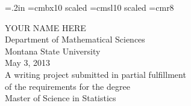 \pagestyle{myheadings}
\jot=.2in
\setlength{\topmargin}{-.5 in}
\setlength{\footheight}{0 in}
\setlength{\textheight}{9. in}
\setlength{\oddsidemargin}{.1in}
\setlength{\evensidemargin}{-.35in}
\setlength{\textwidth}{6in}
\font\heada=cmbx10 scaled
\font\headb=cmsl10 scaled
\font\headc=cmr8
\raggedright
\setlength{\parindent}{2 em}

\begin{titlepage}
\null
\vspace{2.in}
\begin{center}
{\LARGE\bf } \vspace{.1in}

{\LARGE\bf } \vspace{.1in} 

{\LARGE\bf } \vspace{.1in}  

{\LARGE\bf } \vspace{.1in}  

{\LARGE\bf } \vspace{.1in}  

{\LARGE\bf } \vspace{.1in}  


\vspace{.05in}
{\LARGE\bf $\;$} \\ [.5in]
{\Large  YOUR NAME HERE \\
\vspace{0.5cm}
Department of Mathematical Sciences \\
Montana State University \\ [.5in]}
May 3, 2013 \\ [1.in]
A writing project submitted in partial fulfillment\\
of the requirements for the degree\\[.25in]
Master of Science in Statistics
\end{center}
\end{titlepage}
